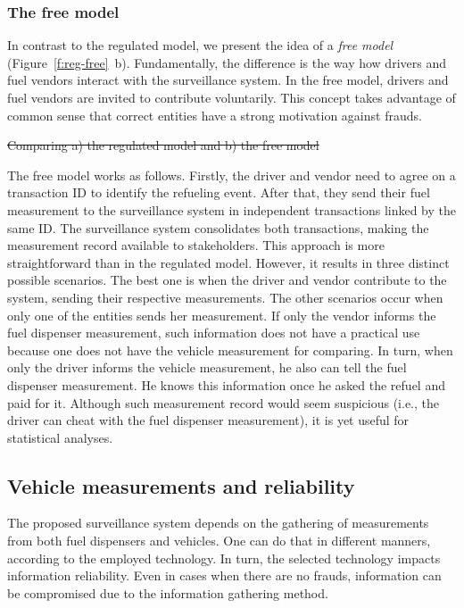 \documentclass[sigplan]{acmart}
\providecommand{\DIFdel}[1]{{\protect\color{red}\sout{#1}}}                      %
\providecommand{\DIFdelbegin}{} %
\providecommand{\DIFdelend}{} %
\providecommand{\DIFdelFL}[1]{\DIFdel{#1}} %
\begin{document}
\subsubsection{The free model}
\label{s:freemodel}
In contrast to the regulated model, we present the idea of a \emph{free model} (Figure~\ref{f:reg-free}~b).
Fundamentally, the difference is the way how drivers and fuel vendors interact with the surveillance system.
In the free model, drivers and fuel vendors are invited to contribute voluntarily.
This concept takes advantage of common sense that correct entities have a strong motivation against frauds.

\DIFdelbegin %
{%
\DIFdelFL{Comparing a) the regulated model and b) the free model}}

\DIFdelend The free model works as follows.
Firstly, the driver and vendor need to agree on a transaction ID to identify the refueling event. 
After that, they send their fuel measurement to the surveillance system in independent transactions linked by the same ID. 
The surveillance system consolidates both transactions, making the measurement record available to stakeholders.
This approach is more straightforward than in the regulated model.
However, it results in three distinct possible scenarios.
The best one is when the driver and vendor contribute to the system, sending their respective measurements.
The other scenarios occur when only one of the entities sends her measurement.
If only the vendor informs the fuel dispenser measurement, such information does not have a practical use because one does not have the vehicle measurement for comparing.
In turn, when only the driver informs the vehicle measurement, he also can tell the fuel dispenser measurement.
He knows this information once he asked the refuel and paid for it.
Although such measurement record would seem suspicious (i.e., the driver can cheat with the fuel dispenser measurement), it is yet useful for statistical analyses.

\subsection{Vehicle measurements and reliability}
The proposed surveillance system depends on the gathering of measurements from both fuel dispensers and vehicles.
One can do that in different manners, according to the employed technology.
In turn, the selected technology impacts information reliability.
Even in cases when there are no frauds, information can be compromised due to the information gathering method.
\end{document}

